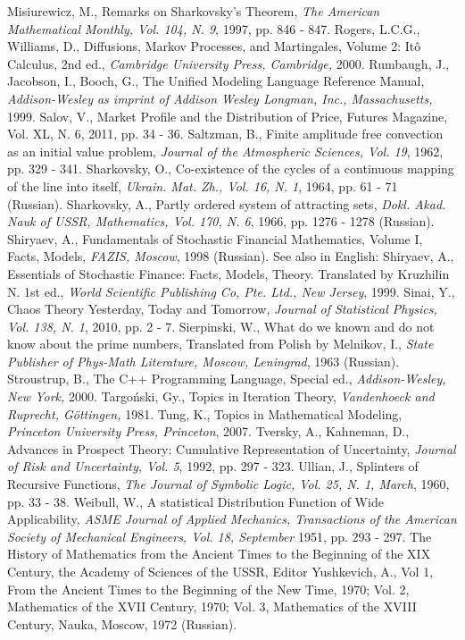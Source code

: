 \documentclass{article}
\begin{document}
\begin{thebibliography}{9}
 Misiurewicz, M., Remarks on Sharkovsky's Theorem, \textit{The American Mathematical Monthly, Vol. 104, N. 9}, 1997, pp. 846 - 847.
 Rogers, L.C.G., Williams, D., Diffusions, Markov Processes, and Martingales, Volume 2: It\^{o} Calculus, 2nd ed., \textit{Cambridge University Press, Cambridge,} 2000.
 Rumbaugh, J., Jacobson, I., Booch, G., The Unified Modeling Language Reference Manual, \textit{Addison-Wesley as imprint of Addison Wesley Longman, Inc., Massachusetts,} 1999.
 Salov, V., Market Profile and the Distribution of Price, {Futures Magazine, Vol. XL, N. 6}, 2011, pp. 34 - 36.
 Saltzman, B., Finite amplitude free convection as an initial value problem, \textit{Journal of the Atmospheric Sciences, Vol. 19}, 1962, pp. 329 - 341.
 Sharkovsky, O., Co-existence of the cycles of a continuous mapping of the line into itself, \textit{Ukrain. Mat. Zh., Vol. 16, N. 1}, 1964, pp. 61 - 71 (Russian).
 Sharkovsky, A., Partly ordered system of attracting sets, \textit{Dokl. Akad. Nauk of USSR, Mathematics, Vol. 170, N. 6}, 1966, pp. 1276 - 1278 (Russian).
 Shiryaev, A., Fundamentals of Stochastic Financial Mathematics, Volume I, Facts, Models, \textit{FAZIS, Moscow}, 1998 (Russian). See also in English: Shiryaev, A., Essentials of Stochastic Finance: Facts, Models, Theory. Translated by Kruzhilin N. 1st ed., \textit{World Scientific Publishing Co, Pte. Ltd., New Jersey}, 1999.
 Sinai, Y., Chaos Theory Yesterday, Today and Tomorrow, \textit{Journal of Statistical Physics, Vol. 138, N. 1}, 2010, pp. 2 - 7.
 Sierpinski, W., What do we known and do not know about the prime numbers, Translated from Polish by Melnikov, I., \textit{State Publisher of Phys-Math Literature, Moscow, Leningrad}, 1963 (Russian).
 Stroustrup, B., The C++ Programming Language, Special ed., \textit{Addison-Wesley, New York,} 2000.
 Targo\'{n}ski, Gy., Topics in Iteration Theory, \textit{Vandenhoeck and Ruprecht, G\"{o}ttingen,} 1981.
 Tung, K., Topics in Mathematical Modeling, \textit{Princeton University Press, Princeton}, 2007.
 Tversky, A., Kahneman, D., Advances in Prospect Theory: Cumulative Representation of Uncertainty, \textit{Journal of Risk and Uncertainty, Vol. 5}, 1992, pp. 297 - 323.
 Ullian, J., Splinters of Recursive Functions, \textit{The Journal of Symbolic Logic, Vol. 25, N. 1, March}, 1960, pp. 33 - 38.
 Weibull, W., A statistical Distribution Function of Wide Applicability, \textit{ASME Journal of Applied Mechanics, Transactions of the American Society of Mechanical Engineers, Vol. 18, September} 1951, pp. 293 - 297. 
 The History of Mathematics from the Ancient Times to the Beginning of the XIX Century, the Academy of Sciences of the USSR, Editor Yushkevich, A., Vol 1, From the Ancient Times to the Beginning of the New Time, 1970; Vol. 2, Mathematics of the XVII Century, 1970; Vol. 3, Mathematics of the XVIII Century, Nauka, Moscow, 1972 (Russian).
\end{thebibliography}
\end{document}
